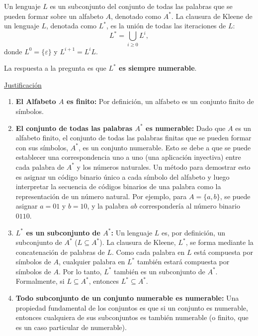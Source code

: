 \documentclass[12pt]{report} %
\begin{document}
\begin{solucion}
Un lenguaje \(L\) es un subconjunto del conjunto de todas las palabras que se pueden formar sobre un alfabeto \(A\), denotado como \(A^*\). La clausura de Kleene de un lenguaje \(L\), denotada como \(L^*\), es la unión de todas las iteraciones de \(L\):
\[ L^* = \bigcup_{i \geq 0} L^i, \]
donde \(L^0 = \{\varepsilon\}\) y \(L^{i+1} = L^iL\).

La respuesta a la pregunta es que \textbf{\(L^*\) es siempre numerable}.

\underline{Justificación}

\begin{enumerate}
    \item \textbf{El Alfabeto \(A\) es finito:} Por definición, un alfabeto es un conjunto finito de símbolos.

    \item \textbf{El conjunto de todas las palabras \(A^*\) es numerable:} Dado que \(A\) es un alfabeto finito, el conjunto de todas las palabras finitas que se pueden formar con sus símbolos, \(A^*\), es un conjunto numerable. Esto se debe a que se puede establecer una correspondencia uno a uno (una aplicación inyectiva) entre cada palabra de \(A^*\) y los números naturales. Un método para demostrar esto es asignar un código binario único a cada símbolo del alfabeto y luego interpretar la secuencia de códigos binarios de una palabra como la representación de un número natural. Por ejemplo, para \(A = \{a, b\}\), se puede asignar \(a=01\) y \(b=10\), y la palabra \(ab\) correspondería al número binario \(0110\).

    \item \textbf{\(L^*\) es un subconjunto de \(A^*\):} Un lenguaje \(L\) es, por definición, un subconjunto de \(A^*\) (\(L \subseteq A^*\)). La clausura de Kleene, \(L^*\), se forma mediante la concatenación de palabras de \(L\). Como cada palabra en \(L\) está compuesta por símbolos de \(A\), cualquier palabra en \(L^*\) también estará compuesta por símbolos de \(A\). Por lo tanto, \(L^*\) también es un subconjunto de \(A^*\). Formalmente, si \(L \subseteq A^*\), entonces \(L^* \subseteq A^*\).

    \item \textbf{Todo subconjunto de un conjunto numerable es numerable:} Una propiedad fundamental de los conjuntos es que si un conjunto es numerable, entonces cualquiera de sus subconjuntos es también numerable (o finito, que es un caso particular de numerable).
\end{enumerate}


\end{solucion}
\end{document}
